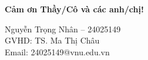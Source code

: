 \documentclass[aspectratio=169,11pt]{beamer}
\begin{document}
\begin{frame}{}
\centering
\vfill
{\LARGE \textbf{Cảm ơn Thầy/Cô và các anh/chị!}}

\vspace{0.5cm}
{\large Nguyễn Trọng Nhân -- 24025149}\\
{\normalsize GVHD: TS. Ma Thị Châu}\\
\vspace{0.3cm}
{\small Email: 24025149@vnu.edu.vn}
\vfill
\end{frame}
\end{document}
